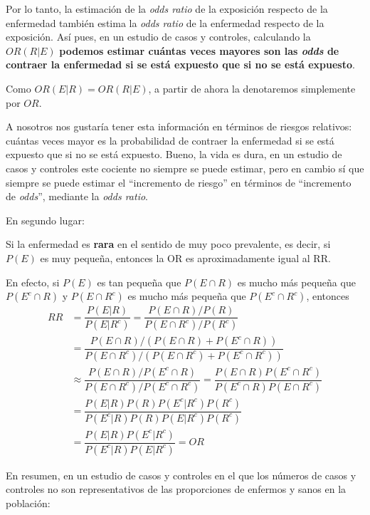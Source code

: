 \documentclass[
]{book}
\theoremstyle{definition}
\theoremstyle{definition}
\theoremstyle{definition}
\theoremstyle{definition}
\theoremstyle{remark}
\begin{document}
Por lo tanto, la estimación de la \emph{odds ratio} de la exposición respecto de la enfermedad también estima la \emph{odds ratio} de la enfermedad respecto de la exposición. Así pues, en un estudio de casos y controles, calculando la \(OR(R|E)\) \textbf{podemos estimar cuántas veces mayores son las \emph{odds} de contraer la enfermedad si se está expuesto que si no se está expuesto}.

\begin{rmdnote}
Como \(OR(E|R)=OR(R|E)\), a partir de ahora la denotaremos simplemente por \(OR\).
\end{rmdnote}

A nosotros nos gustaría tener esta información en términos de riesgos relativos: cuántas veces mayor es la probabilidad de contraer la enfermedad si se está expuesto que si no se está expuesto. Bueno, la vida es dura, en un estudio de casos y controles este cociente no siempre se puede estimar, pero en cambio sí que siempre se puede estimar el ``incremento de riesgo'' en términos de ``incremento de \emph{odds}'', mediante la \emph{odds ratio}.

En segundo lugar:

\begin{rmdimportant}
Si la enfermedad es \textbf{rara} en el sentido de muy poco prevalente, es decir, si \(P(E)\) es muy pequeña, entonces la OR es aproximadamente igual al RR.
\end{rmdimportant}

\begin{rmdcorbes}
En efecto, si \(P(E)\) es tan pequeña que \(P(E\cap R)\) es mucho más pequeña que \(P(E^c\cap R)\) y \(P(E\cap R^c)\) es mucho más pequeña que \(P(E^c\cap R^c)\), entonces
\[
\begin{array}{rl}
RR\!\!\!\! & =\dfrac{P(E|R)}{P(E|R^c)}
=\dfrac{P(E\cap R)/P(R)}{P(E\cap R^c)/P(R^c)}\\
& =\dfrac{{P(E\cap R)}/({P(E\cap R)+P(E^c\cap R)})}{{P(E\cap R^c)}/({P(E\cap R^c)+P(E^c\cap R^c)})}\\
& \approx \dfrac{{P(E\cap R)}/{P(E^c\cap R)}}{{P(E\cap R^c)}/{P(E^c\cap R^c)}}=\dfrac{P(E\cap R)P(E^c\cap R^c)}{P(E^c\cap R) P(E\cap R^c)}\\
& = \dfrac{P(E|R)P(R)P(E^c|R^c)P(R^c)}{P(E^c|R)P(R) P(E|R^c)P(R^c)}\\
& = \dfrac{P(E|R)P(E^c|R^c)}{P(E^c|R) P(E|R^c)}=OR
\end{array}
\]
\end{rmdcorbes}

En resumen, en un estudio de casos y controles en el que los números de casos y controles no son representativos de las proporciones de enfermos y sanos en la población:
\end{document}
